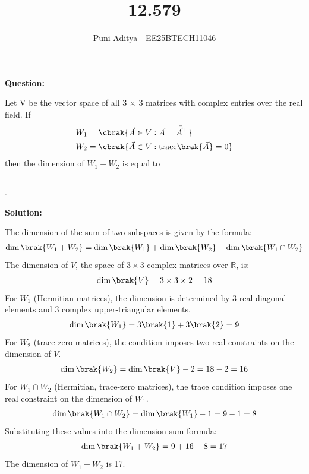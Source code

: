 \documentclass[journal]{IEEEtran}
\begin{document}
\title{12.579}
\author{Puni Aditya - EE25BTECH11046}
\maketitle

\textbf{Question:}

Let V be the vector space of all 3 × 3 matrices with complex entries over the real
field. If
\begin{align*}
    W_1 &= \cbrak{\vec{A} \in V : \vec{A} = \bar{\vec{A}}^\top} \\
    W_2 &= \cbrak{\vec{A} \in V : \text{trace} \brak{\vec{A}} = 0}
\end{align*}
then the dimension of $W_1 + W_2$ is equal to \rule{2cm}{0.4pt}.

\textbf{Solution:}

The dimension of the sum of two subspaces is given by the formula:
\begin{align}
    \dim\brak{W_1 + W_2} = \dim\brak{W_1} + \dim\brak{W_2} - \dim\brak{W_1 \cap W_2}
\end{align}
The dimension of $V$, the space of $3 \times 3$ complex matrices over $\mathbb{R}$, is:
\begin{align}
    \dim\brak{V} = 3 \times 3 \times 2 = 18
\end{align}
For $W_1$ (Hermitian matrices), the dimension is determined by 3 real diagonal elements and 3 complex upper-triangular elements.
\begin{align}
    \dim\brak{W_1} = 3\brak{1} + 3\brak{2} = 9
\end{align}
For $W_2$ (trace-zero matrices), the condition imposes two real constraints on the dimension of $V$.
\begin{align}
    \dim\brak{W_2} = \dim\brak{V} - 2 = 18 - 2 = 16
\end{align}
For $W_1 \cap W_2$ (Hermitian, trace-zero matrices), the trace condition imposes one real constraint on the dimension of $W_1$.
\begin{align}
    \dim\brak{W_1 \cap W_2} = \dim\brak{W_1} - 1 = 9 - 1 = 8
\end{align}
Substituting these values into the dimension sum formula:
\begin{align}
    \dim\brak{W_1 + W_2} = 9 + 16 - 8 = 17
\end{align}
The dimension of $W_1 + W_2$ is 17.
\end{document}

